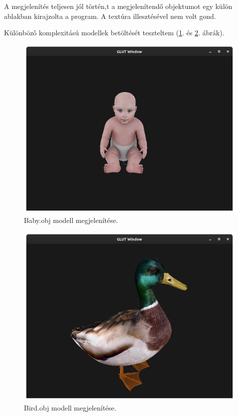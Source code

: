 A megjelenítés teljesen jól történ,t a megjelenítendő objektumot egy külön ablakban kirajzolta a program. A textúra illesztésével nem volt gond.

Különböző komplexitású modellek betöltését teszteltem (\ref{fig:modelbaby}. és  \ref{fig:modelbird}. ábrák).

\begin{figure}[h]
\centering
\includegraphics[scale=0.35]{images/model1.png}
\caption{Baby.obj modell megjelenítése.}
\label{fig:modelbaby}
\end{figure}

\begin{figure}[h]
\centering
\includegraphics[scale=0.35]{images/bird.png}
\caption{Bird.obj modell megjelenítése.}
\label{fig:modelbird}
\end{figure}


